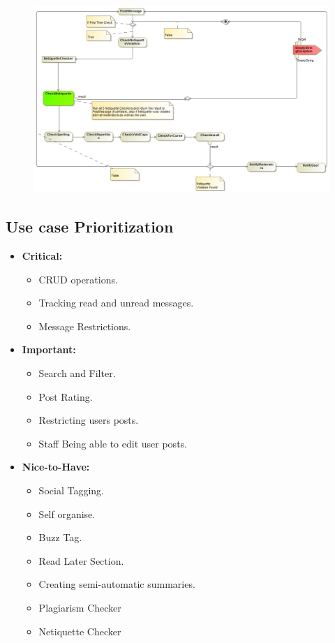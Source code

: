 \documentclass[11pt]{article}
\begin{document}
\begin{enumerate}
\begin{itemize}
\begin{figure}[H]
	  			\includegraphics[scale=0.35]{NetProcessDiagram.jpg}
	  		\end{figure}
	  	\end{itemize}

\end{enumerate}

\subsection{Use case Prioritization}
\begin{itemize}
\item \textbf{Critical: }
	\begin{itemize}
		\item CRUD operations.
		\item Tracking read and unread messages.
		\item Message Restrictions.
	\end{itemize}

\item \textbf{Important: }
	\begin{itemize}
		\item Search and Filter.
		\item Post Rating.
		\item Restricting users posts.
		\item Staff Being able to edit user posts.
	\end{itemize}

\item \textbf{Nice-to-Have: }
	\begin{itemize}
		\item Social Tagging.
		\item Self organise.
		\item Buzz Tag.
		\item Read Later Section.
		\item Creating semi-automatic summaries.
		\item Plagiarism Checker
		\item Netiquette Checker
	\end{itemize}
\end{itemize}
\end{document}
